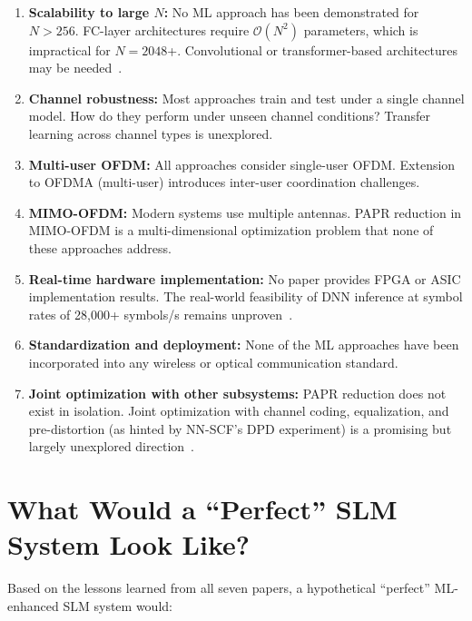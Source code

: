 \begin{enumerate}
    \item \textbf{Scalability to large $N$:}
          No ML approach has been demonstrated for $N > 256$.
          FC-layer architectures require $\mathcal{O}(N^2)$ parameters,
          which is impractical for $N = 2048$+.
          Convolutional or transformer-based architectures may be
          needed~\cite{da2024survey}.
    \item \textbf{Channel robustness:}
          Most approaches train and test under a single channel model.
          How do they perform under unseen channel conditions?
          Transfer learning across channel types is unexplored.
    \item \textbf{Multi-user OFDM:}
          All approaches consider single-user OFDM.
          Extension to OFDMA (multi-user) introduces inter-user
          coordination challenges.
    \item \textbf{MIMO-OFDM:}
          Modern systems use multiple antennas.
          PAPR reduction in MIMO-OFDM is a multi-dimensional
          optimization problem that none of these approaches address.
    \item \textbf{Real-time hardware implementation:}
          No paper provides FPGA or ASIC implementation results.
          The real-world feasibility of DNN inference at symbol rates
          of 28,000+ symbols/s remains unproven~\cite{da2024survey}.
    \item \textbf{Standardization and deployment:}
          None of the ML approaches have been incorporated into
          any wireless or optical communication standard.
    \item \textbf{Joint optimization with other subsystems:}
          PAPR reduction does not exist in isolation.
          Joint optimization with channel coding, equalization,
          and pre-distortion (as hinted by NN-SCF's DPD experiment)
          is a promising but largely unexplored
          direction~\cite{zou2021novel,da2024survey}.
\end{enumerate}

\section{What Would a ``Perfect'' SLM System Look Like?}
\label{sec:perfect_system}

Based on the lessons learned from all seven papers, a hypothetical ``perfect'' ML-enhanced SLM system would:

